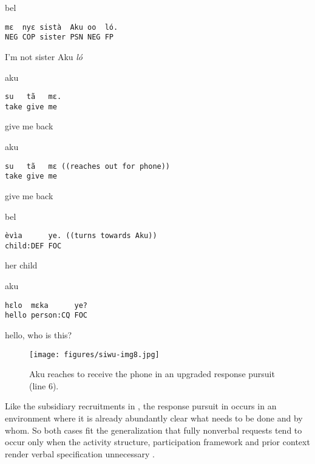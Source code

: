 \documentclass[output=paper]{langsci/langscibook}
\begin{document}
\newpage
{}\vspace{2mm}
%
\begin{transbox}{1}{bel}
\begin{verbatim}
mɛ  nyɛ sistà  Aku oo  ló.
NEG COP sister PSN NEG FP
\end{verbatim}
I’m not sister Aku \textit{ló}
\end{transbox}
%
\begin{transbox}{2}{aku}
\begin{verbatim}
su   tã   mɛ.
take give me
\end{verbatim}
give me back
\end{transbox}
%
%
\begin{transbox}{4}{aku}
\begin{verbatim}
su   tã   mɛ ((reaches out for phone))
take give me
\end{verbatim}
give me back
\end{transbox}
%
\begin{transbox}{5}{bel}
\begin{verbatim}
èvìa      ye. ((turns towards Aku))
child:DEF FOC
\end{verbatim}
her child
\end{transbox}
%
\begin{mdframednoverticalspace}[style=firstfoc]
\end{mdframednoverticalspace}
%
\begin{mdframednoverticalspace}[style=secondfoc]
\end{mdframednoverticalspace}
%
\begin{transbox}{8}{aku}
\begin{verbatim}
hɛlo  mɛka      ye?
hello person:CQ FOC
\end{verbatim}
hello, who is this?
\end{transbox}\bigskip

\begin{figure}
\centering
\texttt{[image: figures/siwu-img8.jpg]}
\caption{Aku reaches to receive the phone in an upgraded response pursuit (line 6).}
\label{fig:dingemanse:4}
\end{figure}

\normalsize
Like the subsidiary recruitments in , the response pursuit in  occurs in an environment where it is already abundantly clear what needs to be done and by whom. So both cases fit the generalization that fully nonverbal requests tend to occur only when the activity structure, participation framework and prior context render verbal specification unnecessary \citep{Rossi2014}.
\end{document}
